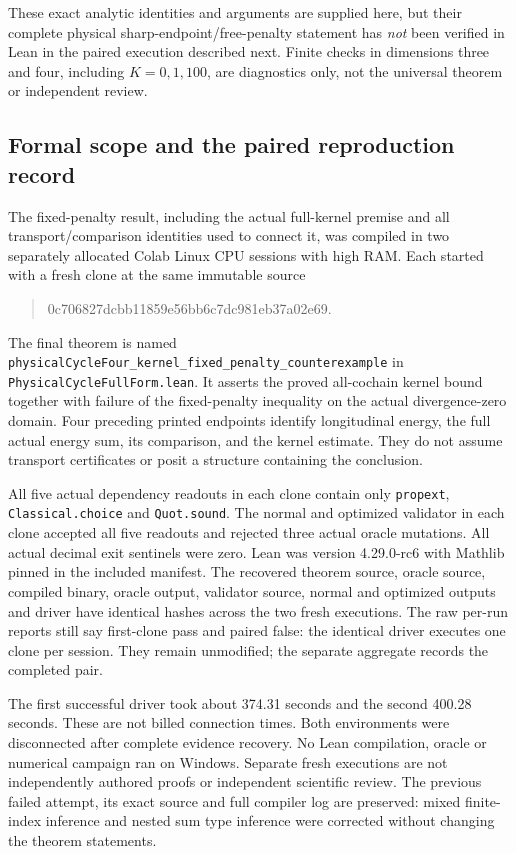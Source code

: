 These exact analytic identities and arguments are supplied here, but their
complete physical sharp-endpoint/free-penalty statement has \emph{not}
been verified in Lean in the paired execution described next. Finite
checks in dimensions three and four, including $K=0,1,100$, are diagnostics
only, not the universal theorem or independent review.

\subsection{Formal scope and the paired reproduction record}
The fixed-penalty result, including the actual full-kernel premise and
all transport/comparison identities used to connect it, was compiled in
two separately allocated Colab Linux CPU sessions with high RAM. Each
started with a fresh clone at the same immutable source
\begin{quote}\small\ttfamily
0c706827dcbb11859e56bb6c7dc981eb37a02e69.
\end{quote}
The final theorem is named
\texttt{physicalCycleFour\_kernel\_fixed\_penalty\_counterexample}
in \texttt{PhysicalCycleFullForm.lean}. It asserts the proved
all-cochain kernel bound together with failure of the fixed-penalty
inequality on the actual divergence-zero domain. Four preceding printed
endpoints identify longitudinal energy, the full actual energy sum,
its comparison, and the kernel estimate. They do not assume transport
certificates or posit a structure containing the conclusion.

All five actual dependency readouts in each clone contain only
\texttt{propext}, \texttt{Classical.choice} and \texttt{Quot.sound}.
The normal and optimized validator in each clone accepted all five
readouts and rejected three actual oracle mutations. All actual decimal
exit sentinels were zero. Lean was version 4.29.0-rc6 with Mathlib pinned
in the included manifest. The recovered theorem source, oracle source,
compiled binary, oracle output, validator source, normal and optimized
outputs and driver have identical hashes across the two fresh executions.
The raw per-run reports still say first-clone pass and paired false:
the identical driver executes one clone per session. They remain
unmodified; the separate aggregate records the completed pair.

The first successful driver took about 374.31 seconds and the second
400.28 seconds. These are not billed connection times. Both environments
were disconnected after complete evidence recovery. No Lean compilation,
oracle or numerical campaign ran on Windows. Separate fresh executions
are not independently authored proofs or independent scientific review.
The previous failed attempt, its exact source and full compiler log are
preserved: mixed finite-index inference and nested sum type inference
were corrected without changing the theorem statements.

